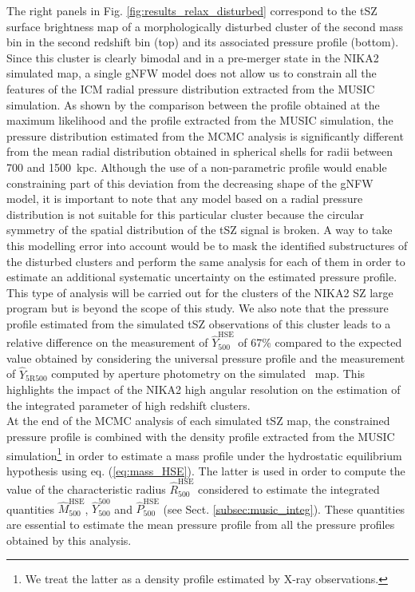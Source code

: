 \documentclass[twocolumn,traditabstract]{aa}
\begin{document}
The right panels in Fig. \ref{fig:results_relax_disturbed} correspond to the tSZ surface brightness map of a morphologically disturbed cluster of the second mass bin in the second redshift bin (top) and its associated pressure profile (bottom). Since this cluster is clearly bimodal and in a pre-merger state in the NIKA2 simulated map, a single gNFW model does not allow us to constrain all the features of the ICM radial pressure distribution extracted from the MUSIC simulation. As shown by the comparison between the profile obtained at the maximum likelihood and the profile extracted from the MUSIC simulation, the pressure distribution estimated from the MCMC analysis is significantly different from the mean radial distribution obtained in spherical shells for radii between 700 and 1500~kpc. Although the use of a non-parametric profile would enable constraining part of this deviation from the decreasing shape of the gNFW model, it is important to note that any model based on a radial pressure distribution is not suitable for this particular cluster because the circular symmetry of the spatial distribution of the tSZ signal is broken. A way to take this modelling error into account would be to mask the identified substructures of the disturbed clusters and perform the same analysis for each of them in order to estimate an additional systematic uncertainty on the estimated pressure profile. This type of analysis will be carried out for the clusters of the NIKA2 SZ large program but is beyond the scope of this study. We also note that the pressure profile estimated from the simulated tSZ observations of this cluster leads to a relative difference on the measurement of $\hat{Y}_{500}^{\mathrm{HSE}}$ of 67\% compared to the expected value obtained by considering the \cite{arn10} universal pressure profile and the measurement of $\hat{Y}_{\mathrm{5R500}}$ computed by aperture photometry on the simulated \planck\ map. This highlights the impact of the NIKA2 high angular resolution on the estimation of the integrated parameter of high redshift clusters.\\

At the end of the MCMC analysis of each simulated tSZ map, the constrained pressure profile is combined with the density profile extracted from the MUSIC simulation\footnote{We treat the latter as a density profile estimated by X-ray observations.} in order to estimate a mass profile under the hydrostatic equilibrium hypothesis using eq. (\ref{eq:mass_HSE}). The latter is used in order to compute the value of the characteristic radius $\hat{R}_{500}^{\mathrm{HSE}}$ considered to estimate the integrated quantities $\hat{M}_{500}^{\mathrm{HSE}}$, $\hat{Y}_{500}^{\mathrm{500}}$ and $\hat{P}_{500}^{\mathrm{HSE}}$ (see Sect. \ref{subsec:music_integ}). These quantities are essential to estimate the mean pressure profile from all the pressure profiles obtained by this analysis.
\end{document}
